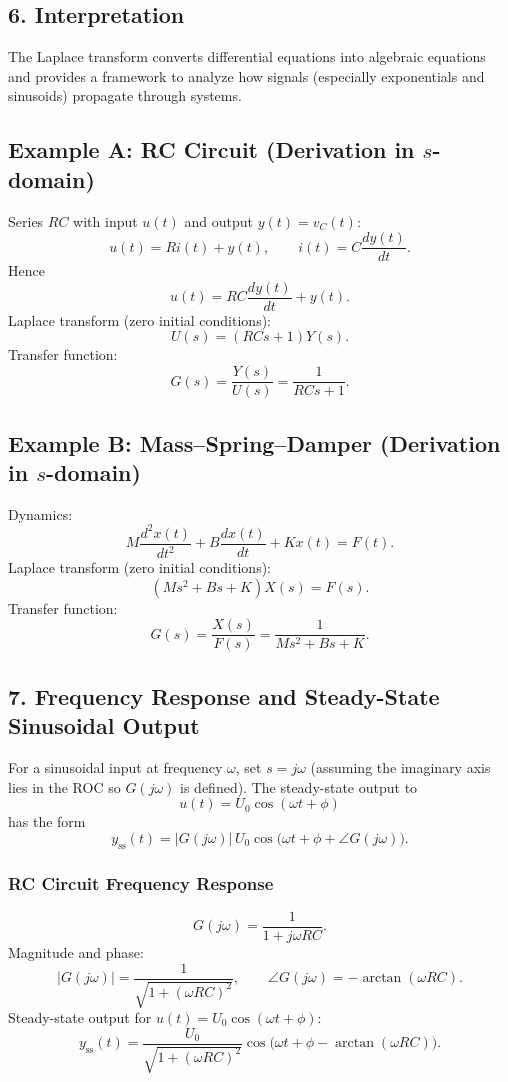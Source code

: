 \documentclass[12pt,a4paper]{article}
\begin{document}
	\subsection*{6. Interpretation}
	The Laplace transform converts differential equations into algebraic equations and provides a framework to analyze how signals (especially exponentials and sinusoids) propagate through systems.
	
	\bigskip
	
	\subsection*{Example A: RC Circuit (Derivation in $s$-domain)}
	Series $RC$ with input $u(t)$ and output $y(t)=v_C(t)$:
	$$
	u(t) = R i(t) + y(t), \qquad i(t) = C \frac{dy(t)}{dt}.
	$$
	Hence
	$$
	u(t) = RC \frac{dy(t)}{dt} + y(t).
	$$
	Laplace transform (zero initial conditions):
	$$
	U(s) = (RCs + 1) Y(s).
	$$
	Transfer function:
	$$
	G(s) = \frac{Y(s)}{U(s)} = \frac{1}{RCs+1}.
	$$
	
	\subsection*{Example B: Mass--Spring--Damper (Derivation in $s$-domain)}
	Dynamics:
	$$
	M \frac{d^2 x(t)}{dt^2} + B \frac{dx(t)}{dt} + K x(t) = F(t).
	$$
	Laplace transform (zero initial conditions):
	$$
	(Ms^2 + Bs + K) X(s) = F(s).
	$$
	Transfer function:
	$$
	G(s) = \frac{X(s)}{F(s)} = \frac{1}{Ms^2 + Bs + K}.
	$$
	
	\subsection*{7. Frequency Response and Steady-State Sinusoidal Output}
	For a sinusoidal input at frequency $\omega$, set $s = j\omega$ (assuming the imaginary axis lies in the ROC so $G(j\omega)$ is defined). The steady-state output to
	$$
	u(t) = U_0 \cos(\omega t + \phi)
	$$
	has the form
	$$
	y_{\text{ss}}(t) = |G(j\omega)| \, U_0 \cos\big(\omega t + \phi + \angle G(j\omega)\big).
	$$
	
	\subsubsection*{RC Circuit Frequency Response}
	$$
	G(j\omega) = \frac{1}{1 + j\omega RC}.
	$$
	Magnitude and phase:
	$$
	|G(j\omega)| = \frac{1}{\sqrt{1 + (\omega RC)^2}}, \qquad
	\angle G(j\omega) = -\arctan(\omega RC).
	$$
	Steady-state output for $u(t) = U_0 \cos(\omega t + \phi)$:
	$$
	y_{\text{ss}}(t) = \frac{U_0}{\sqrt{1 + (\omega RC)^2}} \cos\big(\omega t + \phi - \arctan(\omega RC)\big).
	$$
	
\end{document}
